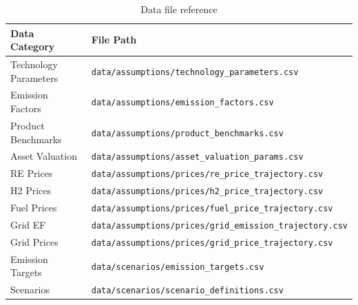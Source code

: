 \documentclass[12pt,a4paper]{article}
\begin{document}
\begin{table}[H]
\centering
\begin{tabular}{ll}
\toprule
\textbf{Data Category} & \textbf{File Path} \\
\midrule
Technology Parameters & \texttt{data/assumptions/technology\_parameters.csv} \\
Emission Factors & \texttt{data/assumptions/emission\_factors.csv} \\
Product Benchmarks & \texttt{data/assumptions/product\_benchmarks.csv} \\
Asset Valuation & \texttt{data/assumptions/asset\_valuation\_params.csv} \\
RE Prices & \texttt{data/assumptions/prices/re\_price\_trajectory.csv} \\
H2 Prices & \texttt{data/assumptions/prices/h2\_price\_trajectory.csv} \\
Fuel Prices & \texttt{data/assumptions/prices/fuel\_price\_trajectory.csv} \\
Grid EF & \texttt{data/assumptions/prices/grid\_emission\_trajectory.csv} \\
Grid Prices & \texttt{data/assumptions/prices/grid\_price\_trajectory.csv} \\
Emission Targets & \texttt{data/scenarios/emission\_targets.csv} \\
Scenarios & \texttt{data/scenarios/scenario\_definitions.csv} \\
\bottomrule
\end{tabular}
\caption{Data file reference}
\end{table}


\end{document}
